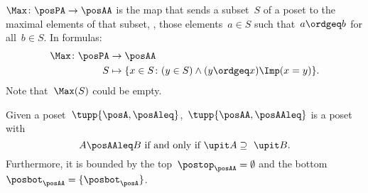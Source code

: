 \begin{definition}[Max]
  \label{def:Max}
  $\Max \colon \posPA \to \posAA$ is the map that sends a subset~$S$ of a poset to the maximal elements of that subset, \ie , those elements~$a \in S$ such that~$a \ordgeq b$ for all~$b \in S$. In formulas:
  \begin{equation*}
    \begin{aligned}
      \Max \colon \posPA &\to \posAA\\
      S&\mapsto \{ x\in S\colon (y\in S)\wedge(y\ordgeq x)\Imp (x=y)\}.
    \end{aligned}
  \end{equation*}
  Note that~$\Max(S)$ could be empty.
\end{definition}


\begin{lemma}\label{lem:orderantichain}
  Given a poset~$\tupp{\posA,\posAleq}$,~$\tupp{\posAA,\posAAleq}$ is a poset with
  \begin{equation}
    \label{eq:orderantichain}
    A\posAAleq B \text{ if and only if } \upit  A \supseteq \ \upit  B.
  \end{equation}
  Furthermore, it is bounded by the top~$\postop_{\posAA}=\emptyset$ and the bottom~$\posbot_{\posAA}=\{\posbot_{\posA}\}$.
\end{lemma}

